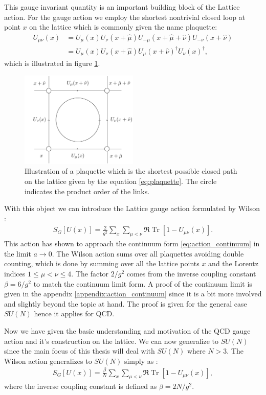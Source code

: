\documentclass[english,twoside,openright]{UH_TCM_MSc}
\DeclareMathOperator{\Tr}{Tr}
\begin{document}
This gauge invariant quantity is an important building block of the Lattice action. For the gauge action we employ the shortest nontrivial closed loop at point $x$ on the lattice which is commonly given the name plaquette:
\begin{align}
    U_{\mu\nu}(x) &= U_\mu(x)U_\nu(x+\hat\mu)U_{-\mu}(x+\hat\mu+\hat\nu)U_{-\nu}(x+\hat\nu) \\
    &= U_\mu(x)U_\nu(x+\hat{\mu})U_\mu(x+\hat\nu)^\dagger U_\nu(x)^\dagger, \label{eq:plaquette}
\end{align}
which is illustrated in figure \ref{fig:plaquette}.
\begin{figure}[htpb]
    \centering
    \includegraphics[width=0.5\textwidth]{final_plots/misc/plaquette.pdf}
    \caption{Illustration of a plaquette which is the shortest possible closed path on the lattice given by the equation \ref{eq:plaquette}. The circle indicates the product order of the links.}
    \label{fig:plaquette}
\end{figure}

With this object we can introduce the Lattice gauge action formulated by Wilson \cite{Wilson:1974sk}:
\begin{align}
    S_G[U(x)] = \frac{2}{g^2}\sum_{x}\sum_{\mu <\nu}\Re\Tr[1-U_{\mu\nu}(x)].
\end{align}
This action has shown to approach the continuum form \ref{eq:action_continuum} in the limit $a\rightarrow0$. The Wilson action sums over all plaquettes avoiding double counting, which is done by summing over all the lattice points $x$ and the Lorentz indices $1\leq \mu < \nu \leq 4$. The factor $2/g^2$ comes from the inverse coupling constant $\beta=6/g^2$ to match the continuum limit form. A proof of the continuum limit is given in the appendix \ref{appendix:action_continuum} since it is a bit more involved and slightly beyond the topic at hand. The proof is given for the general case $SU(N)$ hence it applies for QCD. 

Now we have given the basic understanding and motivation of the QCD gauge action and it's construction on the lattice. We can now generalize to $SU(N)$ since the main focus of this thesis will deal with $SU(N)$ where $N > 3$. The Wilson action generalizes to $SU(N)$ simply as \cite[ch. 3.6]{gattringer2009quantum}:
\begin{align}
    S_G[U(x)] = \frac{\beta}{N}\sum_{x}\sum_{\mu <\nu}\Re\Tr[1-U_{\mu\nu}(x)], \label{eq:wilson_action}
\end{align}
where the inverse coupling constant is defined as $\beta=2N/g^2$. 
\end{document}
